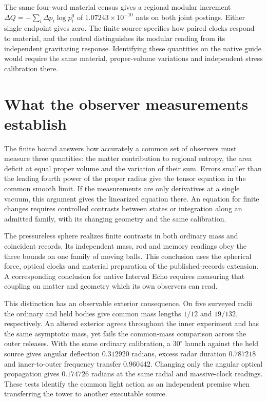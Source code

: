 \documentclass[11pt]{article}
\begin{document}
The same four-word material census gives a regional modular increment
$\Delta Q=-\sum_i\Delta p_i\log p_i^0$ of
$1.07243\times10^{-10}$ nats on both joint postings. Either single
endpoint gives zero. The finite source specifies how paired clocks
respond to material, and the control distinguishes its modular
reading from its independent gravitating response. Identifying these
quantities on the native guide would require the same material,
proper-volume variations and independent stress calibration there.

\section{What the observer measurements establish}
The finite bound answers how accurately a common set of observers must
measure three quantities: the matter contribution to regional entropy,
the area deficit at equal proper volume and the variation of their sum.
Errors smaller than the leading fourth power of the proper radius give
the tensor equation in the common smooth limit. If the measurements are
only derivatives at a single vacuum, this argument gives the linearized
equation there. An equation for finite changes requires controlled
contrasts between states or integration along an admitted family, with
its changing geometry and the same calibration.

The pressureless sphere realizes finite contrasts in both ordinary mass
and coincident records. Its independent mass, rod and memory readings
obey the three bounds on one family of moving balls. This conclusion
uses the spherical force, optical clocks and material preparation of the
published-records extension. A corresponding conclusion for native
Interval Echo requires measuring that coupling on matter and geometry
which its own observers can read.

This distinction has an observable exterior consequence. On five surveyed
radii the ordinary and held bodies give common mass lengths $1/12$ and
$19/132$, respectively. An altered exterior agrees throughout the inner
experiment and has the same asymptotic mass, yet fails the common-mass
comparison across the outer releases. With the same ordinary calibration,
a $30^\circ$ launch against the held source gives angular deflection
$0.312920$ radians, excess radar duration $0.787218$ and inner-to-outer
frequency transfer $0.960442$. Changing only the angular optical
propagation gives $0.174726$ radians at the same radial and massive-clock
readings. These tests identify the common light action as an independent
premise when transferring the tower to another executable source.
\end{document}
